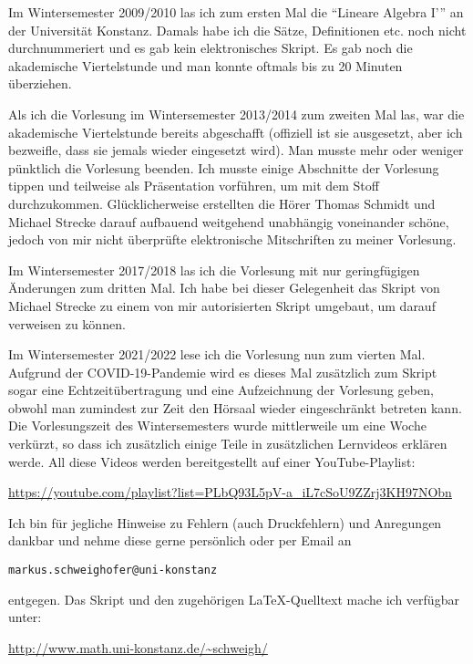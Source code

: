 \documentclass[../main.tex]{subfiles}
\begin{document}
Im Wintersemester 2009/2010 las ich zum ersten Mal die "`Lineare Algebra I'"' an der Universität Konstanz.
Damals habe ich die Sätze, Definitionen etc. noch nicht durchnummeriert und es gab kein elektronisches Skript.
Es gab noch die akademische Viertelstunde und man konnte oftmals bis zu 20 Minuten überziehen.

\bigskip\noindent
Als ich die Vorlesung im Wintersemester 2013/2014
zum zweiten Mal las, war die akademische Viertelstunde bereits abgeschafft (offiziell ist sie
ausgesetzt, aber ich bezweifle, dass sie jemals wieder eingesetzt wird). Man musste mehr oder weniger
pünktlich die Vorlesung beenden.
Ich musste einige Abschnitte der Vorlesung tippen und teilweise als Präsentation vorführen, um mit dem Stoff
durchzukommen. Glücklicherweise erstellten die Hörer Thomas Schmidt und Michael Strecke darauf aufbauend
weitgehend unabhängig voneinander schöne, jedoch von mir nicht überprüfte
elektronische Mitschriften zu meiner Vorlesung.

\bigskip\noindent
Im Wintersemester 2017/2018 las ich die Vorlesung mit nur geringfügigen Änderungen zum dritten Mal.
Ich habe bei dieser Gelegenheit das Skript von Michael Strecke zu einem von mir autorisierten Skript umgebaut, um darauf verweisen zu können.

\bigskip\noindent
Im Wintersemester 2021/2022 lese ich die Vorlesung nun zum vierten Mal. Aufgrund der COVID-19-Pandemie wird es dieses Mal zusätzlich zum Skript
sogar eine Echtzeitübertragung und eine Aufzeichnung der Vorlesung geben, obwohl man zumindest zur Zeit den Hörsaal wieder eingeschränkt
betreten kann. Die Vorlesungszeit des Wintersemesters wurde mittlerweile um eine Woche verkürzt, so dass ich zusätzlich einige Teile in zusätzlichen Lernvideos erklären werde. All diese Videos werden bereitgestellt auf einer YouTube-Playlist:
\begin{center}
\url{https://youtube.com/playlist?list=PLbQ93L5pV-a_iL7cSoU9ZZrj3KH97NObn}
\end{center}

\bigskip\noindent
Ich bin für jegliche Hinweise zu Fehlern (auch Druckfehlern) und Anregungen dankbar und nehme diese gerne persönlich
oder per Email an
\begin{center}
\texttt{markus.schweighofer@uni-konstanz}
\end{center}
entgegen. Das Skript und den zugehörigen
\LaTeX-Quelltext
mache ich verfügbar unter:
\begin{center}
\url{http://www.math.uni-konstanz.de/~schweigh/}
\end{center}
\end{document}

